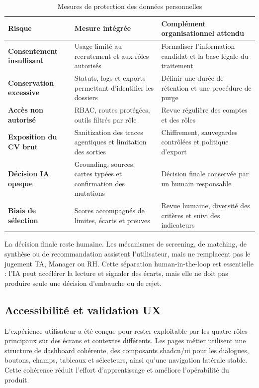 \begin{table}[H]
  \centering
  \caption{\label{tab:data-protection-measures}Mesures de protection des données personnelles}
  \begin{tabularx}{\textwidth}{>{\bfseries}p{3.3cm}X X}
    \toprule
    Risque & Mesure intégrée & Complément organisationnel attendu \\
    \midrule
    Consentement insuffisant & Usage limité au recrutement et aux rôles autorisés & Formaliser l'information candidat et la base légale du traitement \\
    Conservation excessive & Statuts, logs et exports permettant d'identifier les dossiers & Définir une durée de rétention et une procédure de purge \\
    Accès non autorisé & RBAC, routes protégées, outils filtrés par rôle & Revue régulière des comptes et des rôles \\
    Exposition du CV brut & Sanitization des traces agentiques et limitation des sorties & Chiffrement, sauvegardes contrôlées et politique d'export \\
    Décision IA opaque & Grounding, sources, cartes typées et confirmation des mutations & Décision finale conservée par un humain responsable \\
    Biais de sélection & Scores accompagnés de limites, écarts et preuves & Revue humaine, diversité des critères et suivi des indicateurs \\
    \bottomrule
  \end{tabularx}
\end{table}

La décision finale reste humaine. Les mécanismes de screening, de matching, de synthèse ou de recommandation assistent l'utilisateur, mais ne remplacent pas le jugement TA, Manager ou RH. Cette séparation human-in-the-loop est essentielle : l'IA peut accélérer la lecture et signaler des écarts, mais elle ne doit pas produire seule une décision d'embauche ou de rejet.

\subsection{Accessibilité et validation UX}
L'expérience utilisateur a été conçue pour rester exploitable par les quatre rôles principaux sur des écrans et contextes différents. Les pages métier utilisent une structure de dashboard cohérente, des composants shadcn/ui pour les dialogues, boutons, champs, tableaux et sélecteurs, ainsi qu'une navigation latérale stable. Cette cohérence réduit l'effort d'apprentissage et améliore l'opérabilité du produit.

